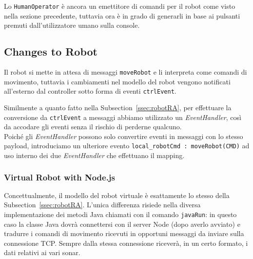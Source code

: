 \documentclass{../llncs}
\newcommand{\codescript}[1]{{\mbox{\small{\texttt{#1}}}}\xspace}
\newcommand{\labelssec}[1]{\label{ssec:#1}}
\newcommand{\xss}[1]{\subsectionname~\ref{ssec:#1}}
\newcommand{\subsectionname}{Subsection}
\begin{document}
Lo \texttt{HumanOperator} è ancora un emettitore di comandi per il robot come visto nella sezione precedente, tuttavia ora è in grado di generarli in base ai pulsanti premuti dall'utilizzatore umano sulla console.\\



\subsection{Changes to Robot}
Il robot si mette in attesa di messaggi \codescript{moveRobot} e li interpreta come comandi di movimento, tuttavia i cambiamenti nel modello del robot vengono notificati all'esterno dal controller sotto forma di eventi \codescript{ctrlEvent}.

Similmente a quanto fatto nella \xss{robotRA}, per effettuare la conversione da \codescript{ctrlEvent} a messaggi abbiamo utilizzato un \emph{EventHandler}, così da accodare gli eventi senza il rischio di perderne qualcuno.\\ %



Poiché gli \emph{EventHandler} possono solo convertire eventi in messaggi con lo stesso payload, introduciamo un ulteriore evento \codescript{local\_robotCmd : moveRobot(CMD)} ad uso interno dei due \emph{EventHandler} che effettuano il mapping.

%

\subsubsection{Virtual Robot with Node.js}
\labelssec{virtualRobotPA}
Concettualmente, il modello del robot virtuale è esattamente lo stesso della \xss{robotRA}. L'unica differenza risiede nella diversa implementazione dei metodi Java chiamati con il comando \codescript{javaRun}: in questo caso la classe Java dovrà connettersi con il server Node (dopo averlo avviato) e tradurre i comandi di movimento ricevuti in opportuni messaggi da inviare sulla connessione TCP. Sempre dalla stessa connessione riceverà, in un certo formato, i dati relativi ai vari sonar.
\end{document}
